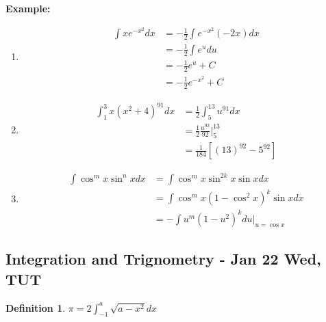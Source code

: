 \documentclass[12pt]{article}
\theoremstyle{plain}
\newtheorem{definition}{Definition}[subsection]
\begin{document}
	{\color{Brown}
	\textbf{Example: }
	\begin{enumerate}
		\item 
			\begin{align*}
			\int xe^{-x^2} dx 
			&= -\frac12 \int e^{-x^2} (-2x) dx\\
			&= -\frac12 \int e^u du \\
			&= -\frac12 e^u + C \\
			&= -\frac12 e^{-x^2} + C
			\end{align*}
			
		\item 
			\begin{align*}
				\int_1^3 x(x^2+4)^{91} dx
				&= \frac 12 \int_5^{13} u^{91} dx\\
				&= \frac 12 \frac{u^{92}}{92} \vert^{13}_5 \\
				&= \frac1{184} [(13)^{92}-5^{92}]
			\end{align*}

		\item 
			\begin{align*}
				\int \cos^m x \sin^n x dx \tag{n \ odd}
				&= \int \cos^m x \sin^{2k} x \sin x dx\\
				&= \int \cos^m x(1-\cos^2 x)^k \sin x dx
				\tag{$ u = \cos x, \  du = -\sin x dx$}\\
				&= -\int u^m(1-u^2)^k du \vert_{u=\cos x}
			\end{align*}
	\end{enumerate}}

	\newpage
	\subsection{Integration and Trignometry - Jan 22 Wed, TUT}
	\begin{definition}
		$\pi = 2\int_{-1}^a \sqrt{a-x^2}dx$ \\
	\end{definition}
\end{document}
